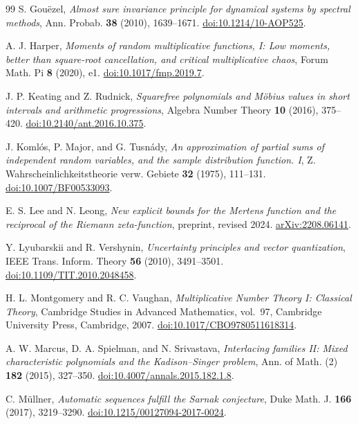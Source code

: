 \documentclass[11pt]{amsart}
\numberwithin{equation}{section}
\theoremstyle{plain}
\theoremstyle{definition}
\theoremstyle{remark}
\begin{document}
\begin{thebibliography}{99}
S. Gou\"ezel,
\emph{Almost sure invariance principle for dynamical systems by spectral
methods},
Ann. Probab. \textbf{38} (2010), 1639--1671.
\href{https://doi.org/10.1214/10-AOP525}{doi:10.1214/10-AOP525}.

A. J. Harper,
\emph{Moments of random multiplicative functions, I: Low moments, better than
square-root cancellation, and critical multiplicative chaos},
Forum Math. Pi \textbf{8} (2020), e1.
\href{https://doi.org/10.1017/fmp.2019.7}{doi:10.1017/fmp.2019.7}.

J. P. Keating and Z. Rudnick,
\emph{Squarefree polynomials and M\"obius values in short intervals and
arithmetic progressions},
Algebra Number Theory \textbf{10} (2016), 375--420.
\href{https://doi.org/10.2140/ant.2016.10.375}{doi:10.2140/ant.2016.10.375}.

J. Koml\'os, P. Major, and G. Tusn\'ady,
\emph{An approximation of partial sums of independent random variables, and
the sample distribution function. I},
Z. Wahrscheinlichkeitstheorie verw. Gebiete \textbf{32} (1975), 111--131.
\href{https://doi.org/10.1007/BF00533093}{doi:10.1007/BF00533093}.

E. S. Lee and N. Leong,
\emph{New explicit bounds for the Mertens function and the reciprocal of the
Riemann zeta-function},
preprint, revised 2024.
\href{https://arxiv.org/abs/2208.06141}{arXiv:2208.06141}.

Y. Lyubarskii and R. Vershynin,
\emph{Uncertainty principles and vector quantization},
IEEE Trans. Inform. Theory \textbf{56} (2010), 3491--3501.
\href{https://doi.org/10.1109/TIT.2010.2048458}{doi:10.1109/TIT.2010.2048458}.

H. L. Montgomery and R. C. Vaughan,
\emph{Multiplicative Number Theory I: Classical Theory},
Cambridge Studies in Advanced Mathematics, vol.~97,
Cambridge University Press, Cambridge, 2007.
\href{https://doi.org/10.1017/CBO9780511618314}%
{doi:10.1017/CBO9780511618314}.

A. W. Marcus, D. A. Spielman, and N. Srivastava,
\emph{Interlacing families II: Mixed characteristic polynomials and the
Kadison--Singer problem},
Ann. of Math. (2) \textbf{182} (2015), 327--350.
\href{https://doi.org/10.4007/annals.2015.182.1.8}{doi:10.4007/annals.2015.182.1.8}.

C. M\"ullner,
\emph{Automatic sequences fulfill the Sarnak conjecture},
Duke Math. J. \textbf{166} (2017), 3219--3290.
\href{https://doi.org/10.1215/00127094-2017-0024}{doi:10.1215/00127094-2017-0024}.


\end{thebibliography}
\end{document}
